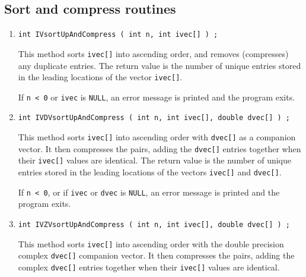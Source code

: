 \subsection{Sort and compress routines}
\label{subsection:Utilities:proto:sortAndCompress}
\par
\begin{enumerate}
\item
\begin{verbatim}
int IVsortUpAndCompress ( int n, int ivec[] ) ;
\end{verbatim}
This method sorts {\tt ivec[]} into ascending order,
and removes (compresses) any duplicate entries.
The return value is the number of unique entries
stored in the leading locations of the vector {\tt ivec[]}.
\par {}
If {\tt n < 0} or {\tt ivec} is {\tt NULL},
an error message is printed and the program exits.
\item
\begin{verbatim}
int IVDVsortUpAndCompress ( int n, int ivec[], double dvec[] ) ;
\end{verbatim}
This method sorts {\tt ivec[]} into ascending order with {\tt dvec[]} 
as a companion vector.
It then compresses the pairs, adding the {\tt dvec[]} entries
together when their {\tt ivec[]} values are identical.
The return value is the number of unique entries stored in the 
leading locations of the vectors {\tt ivec[]} and {\tt dvec[]}.
\par {}
If {\tt n < 0},
or if {\tt ivec} or {\tt dvec} is {\tt NULL},
an error message is printed and the program exits.
\item
\begin{verbatim}
int IVZVsortUpAndCompress ( int n, int ivec[], double dvec[] ) ;
\end{verbatim}
This method sorts {\tt ivec[]} into ascending order with the
double precision complex {\tt dvec[]} companion vector.
It then compresses the pairs, adding the complex {\tt dvec[]} entries
together when their {\tt ivec[]} values are identical.

\end{enumerate}
